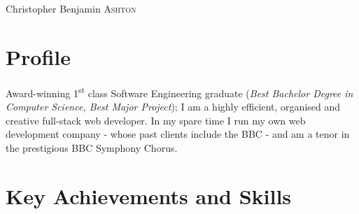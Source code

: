 \documentclass[class=article, crop=false]{standalone}
\begin{document}
\par{\centering
        {\Huge Christopher Benjamin \textsc{Ashton}
    }\bigskip\par}

\begin{center}
\customcontact
\end{center}


\section{Profile}

Award-winning 1\textsuperscript{st} class Software Engineering graduate (\emph{Best Bachelor Degree in Computer Science, Best Major Project}); I am a highly efficient, organised and creative full-stack web developer. In my spare time I run my own web development company - whose past clients include the BBC - and am a tenor in the prestigious BBC Symphony Chorus.

\section{Key Achievements and Skills}
\end{document}
